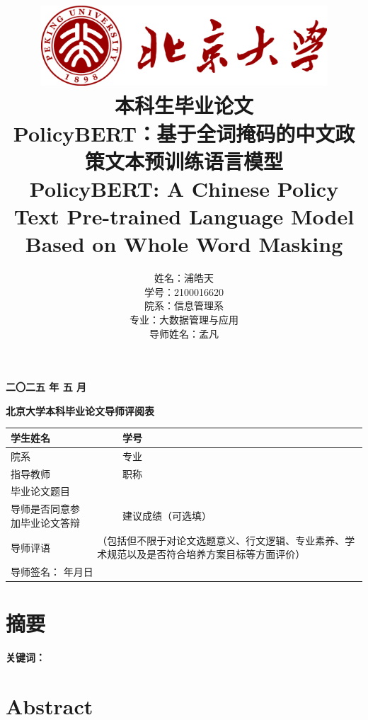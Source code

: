 \documentclass[12pt, a4paper]{ctexart}
\title{
    \includegraphics[width=0.8\textwidth]{./images/logo.png} \\[1em] %
    {\fontsize{40pt}{24pt}\selectfont \textbf 本科生毕业论文} \\[2em] %
    \textbf PolicyBERT：基于全词掩码的中文政策文本预训练语言模型 \\[1em]
    PolicyBERT: A Chinese Policy Text Pre-trained Language Model Based on Whole Word Masking  \\[3em] %
}
\author{姓名：浦皓天 \\
学号：2100016620 \\
院系：信息管理系 \\
专业：大数据管理与应用 \\
导师姓名：孟凡}
\date{}
\begin{document}
\maketitle
\vfill
\begin{center}
    \textbf{二〇二五 年 五 月} \\[1em] %
\end{center}

\newpage
\begin{center}
    \textbf{\LARGE 北京大学本科毕业论文导师评阅表}
\end{center}

\vspace{1em}

\renewcommand{\arraystretch}{1.5} %
\begin{tabularx}{0.87\textwidth}{|X|X|X|X|}
    \hline
    学生姓名 &   & 学号 &  \\
    \hline
    院系 &   & 专业 &  \\
    \hline
    指导教师 &    & 职称 & \\
    \hline
    毕业论文题目 & \multicolumn{3}{l|}{} \\
    \hline
    导师是否同意参加毕业论文答辩 & &建议成绩（可选填） & \\
    \hline
    \vspace{3cm} 导师评语 \newline \rule{0pt}{9cm} & \multicolumn{3}{|p{0.6\textwidth}|}{（包括但不限于对论文选题意义、行文逻辑、专业素养、学术规范以及是否符合培养方案目标等方面评价）} \\ 
    \hline
    \multicolumn{4}{|l|}{导师签名：\hspace{5cm} \underline{\hspace{2cm}}年\underline{\hspace{1cm}}月\underline{\hspace{1cm}}日} \\
    \hline
\end{tabularx}

\newpage
\section*{摘要}

\vspace{2em} %

\textbf{关键词：}
\vspace{2em} %

\newpage
\section*{Abstract}
\end{document}
